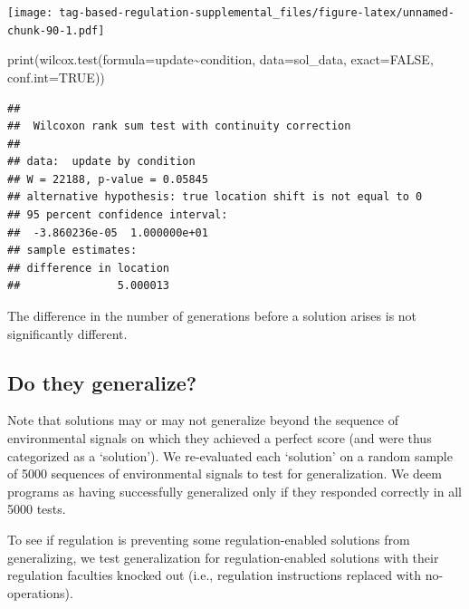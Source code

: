 \documentclass[
]{book}
\newenvironment{Shaded}{\begin{snugshade}}{\end{snugshade}}
\newcommand{\AttributeTok}[1]{\textcolor[rgb]{0.77,0.63,0.00}{#1}}
\newcommand{\ConstantTok}[1]{\textcolor[rgb]{0.00,0.00,0.00}{#1}}
\newcommand{\FunctionTok}[1]{\textcolor[rgb]{0.00,0.00,0.00}{#1}}
\newcommand{\NormalTok}[1]{#1}
\newcommand{\SpecialCharTok}[1]{\textcolor[rgb]{0.00,0.00,0.00}{#1}}
\begin{document}
\texttt{[image: tag-based-regulation-supplemental\_files/figure-latex/unnamed-chunk-90-1.pdf]}

\begin{Shaded}
\begin{Highlighting}[]
\FunctionTok{print}\NormalTok{(}\FunctionTok{wilcox.test}\NormalTok{(}\AttributeTok{formula=}\NormalTok{update}\SpecialCharTok{\textasciitilde{}}\NormalTok{condition, }\AttributeTok{data=}\NormalTok{sol\_data, }\AttributeTok{exact=}\ConstantTok{FALSE}\NormalTok{, }\AttributeTok{conf.int=}\ConstantTok{TRUE}\NormalTok{))}
\end{Highlighting}
\end{Shaded}

\begin{verbatim}
## 
##  Wilcoxon rank sum test with continuity correction
## 
## data:  update by condition
## W = 22188, p-value = 0.05845
## alternative hypothesis: true location shift is not equal to 0
## 95 percent confidence interval:
##  -3.860236e-05  1.000000e+01
## sample estimates:
## difference in location 
##               5.000013
\end{verbatim}

The difference in the number of generations before a solution arises is not significantly different.

\hypertarget{do-they-generalize}{%
\subsection{Do they generalize?}\label{do-they-generalize}}

Note that solutions may or may not generalize beyond the sequence of environmental signals on which they achieved a perfect score (and were thus categorized as a `solution').
We re-evaluated each `solution' on a random sample of 5000 sequences of environmental signals to test for generalization.
We deem programs as having successfully generalized only if they responded correctly in all 5000 tests.

To see if regulation is preventing some regulation-enabled solutions from generalizing, we test generalization for regulation-enabled solutions with their regulation faculties knocked out (i.e., regulation instructions replaced with no-operations).
\end{document}
